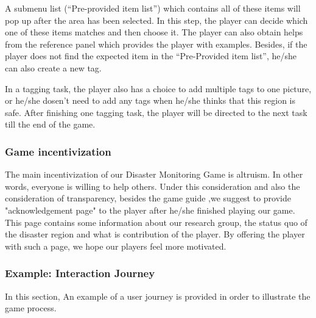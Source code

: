 A submenu list (``Pre-provided item list'') which contains all of these items will pop up after the area has been selected.
In this step,
the player can decide which one of these items matches and then choose it.
The player can also obtain helps from the reference panel which provides the player with examples.
Besides, 
if the player does not find the expected item in the ``Pre-Provided item list'',
he/she can also create a new tag.

In a tagging task,
the player also has a choice to add multiple tags to one picture,
or he/she dosen't need to add any tags when he/she thinks that this region is safe.
After finishing one tagging task, 
the player will be directed to the next task till the end of the game.
\subsubsection{Game incentivization}
The main incentivization of our Disaster Monitoring Game is altruism. In other words, everyone is willing to help others. 
Under this consideration and also the consideration of transparency, besides the game guide ,we suggest to provide "acknowledgement page" to the player after he/she finished playing our game. This page contains some information about our research group, the status quo of the disaster region and what is contribution of the player. By offering the player with such a page, we hope our players feel more motivated.
\subsubsection{Example: Interaction Journey}
In this section,
An example of a user journey is provided in order to illustrate the game process.

